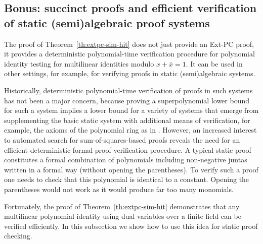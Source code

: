 \documentclass[11pt]{article}
\newcommand{\scterm}[1]{{\textrm{\sc #1}}}
\newcommand{\hit}{\scterm{Hitting}}
\newcommand{\res}{\scterm{Res}}
\newcommand{\extpc}{\scterm{Ext-PC}}
\newcommand{\hitodd}{\scterm{Odd} {\hit}}
\newcommand{\hitk}[1]{\hit$[#1]$}
\newcommand{\TODOJ}[1]{}%
\numberwithin{equation}{section}
\begin{document}
\subsection{Bonus: succinct proofs and efficient verification of static (semi)algebraic proof systems}\label{sec:bonus}

The proof of Theorem~\ref{th:extpc-sim-hit} does not just provide an {\extpc} proof,
it provides a deterministic polynomial-time verification procedure for
polynomial identity testing for multilinear identities modulo $x+\bar{x}=1$. It can be used in other settings, for example,
for verifying proofs in static (semi)algebraic systems.

Historically, deterministic polynomial-time verification
of proofs in such systems has not been a major concern, because proving a superpolynomial lower bound for such a
system implies a lower bound for a variety of systems that emerge from
supplementing the basic static system with additional means of verification,
for example, the axioms of the polynomial ring as in \cite{GH03}.
However, an increased interest to automated search for sum-of-squares-based proofs
reveals the need for an efficient deterministic formal proof verification procedure. 
A typical static proof constitutes a formal combination
of polynomials including non-negative juntas written in a formal way
(without opening the parentheses). 
To verify such a proof one needs to check 
that this polynomial is identical to a constant.
Opening the parentheses would not work as it would produce
far too many monomials.

Fortunately, the proof of Theorem~\ref{th:extpc-sim-hit} demonstrates 
that any multilinear polynomial identity using dual variables over a finite field
can be verified efficiently. In this subsection we show how to use this idea
for static proof checking.
\end{document}
